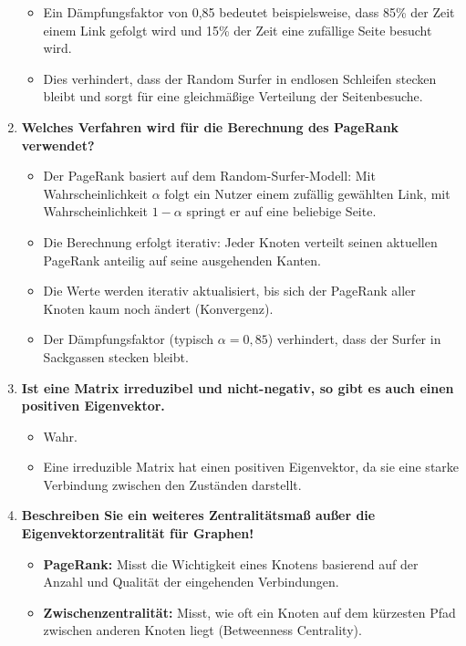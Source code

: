 \documentclass[12pt]{scrartcl}
\begin{document}
\begin{enumerate}
\begin{itemize}
              \item Ein Dämpfungsfaktor von 0{,}85 bedeutet beispielsweise, dass 85\% der Zeit einem Link gefolgt wird und 15\% der Zeit eine zufällige Seite besucht wird.
              \item Dies verhindert, dass der Random Surfer in endlosen Schleifen stecken bleibt und sorgt für eine gleichmäßige Verteilung der Seitenbesuche.
          \end{itemize}
    \item \textbf{Welches Verfahren wird für die Berechnung des PageRank verwendet?}
          \begin{itemize}
              \item Der PageRank basiert auf dem Random-Surfer-Modell: Mit Wahrscheinlichkeit $\alpha$ folgt ein Nutzer einem zufällig gewählten Link, mit Wahrscheinlichkeit $1-\alpha$ springt er auf eine beliebige Seite.
              \item Die Berechnung erfolgt iterativ: Jeder Knoten verteilt seinen aktuellen PageRank anteilig auf seine ausgehenden Kanten.
              \item Die Werte werden iterativ aktualisiert, bis sich der PageRank aller Knoten kaum noch ändert (Konvergenz).
              \item Der Dämpfungsfaktor (typisch $\alpha = 0{,}85$) verhindert, dass der Surfer in Sackgassen stecken bleibt.
          \end{itemize}
          \pagebreak
    \item \textbf{Ist eine Matrix irreduzibel und nicht-negativ, so gibt es auch einen positiven Eigenvektor.}
          \begin{itemize}
              \item Wahr.
              \item Eine irreduzible Matrix hat einen positiven Eigenvektor, da sie eine starke Verbindung zwischen den Zuständen darstellt.
          \end{itemize}
    \item \textbf{Beschreiben Sie ein weiteres Zentralitätsmaß außer die Eigenvektorzentralität für Graphen!}
          \begin{itemize}
              \item \textbf{PageRank:} Misst die Wichtigkeit eines Knotens basierend auf der Anzahl und Qualität der eingehenden Verbindungen.
              \item \textbf{Zwischenzentralität:} Misst, wie oft ein Knoten auf dem kürzesten Pfad zwischen anderen Knoten liegt (Betweenness Centrality).

\end{itemize}
\end{enumerate}
\end{document}
